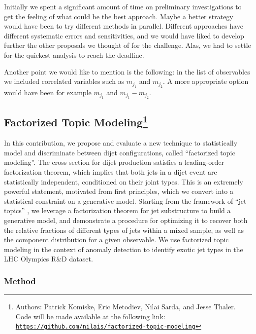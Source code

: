 \documentclass[a4paper,11pt]{article}
\begin{document}
Initially we spent a significant amount of time on preliminary investigations to get the feeling of what could be the best approach. Maybe a better strategy would have been to try different methods in parallel. Different approaches have different systematic errors and sensitivities, and we would have liked to develop further the other proposals we thought of for the challenge. Alas, we had to settle for the quickest analysis to reach the deadline.  

Another point we would like to mention is the following: in the  list of observables we included correlated variables such as  $m_{j_1}$ and $m_{j_2}$. A more appropriate option would have been for example $m_{j_1}$ and $m_{j_1}-m_{j_2}$. 

 \FloatBarrier



\subsection[Factorized Topic Modeling]{Factorized Topic Modeling\footnote{Authors: Patrick Komiske, Eric Metodiev, Nilai Sarda, and Jesse Thaler.  Code will be made available at the following link:\\ \texttt{\url{https://github.com/nilais/factorized-topic-modeling}}}}
\label{sec:factorizedtopics}

In this contribution, we propose and evaluate a new technique to statistically model and discriminate between dijet configurations, called ``factorized topic modeling''.
The cross section for dijet production satisfies a leading-order factorization theorem, which implies that both jets in a dijet event are statistically independent, conditioned on their joint types.
This is an extremely powerful statement, motivated from first principles, which we convert into a statistical constraint on a generative model.
Starting from the framework of ``jet topics'' \cite{Metodiev:2018ftz}, we leverage a factorization theorem for jet substructure to build a generative model, and demonstrate a procedure for optimizing it to recover both the relative fractions of different types of jets within a mixed sample, as well as the component distribution for a given observable. 
We use factorized topic modeling in the context of anomaly detection to identify exotic jet types in the LHC Olympics R\&D dataset.
\subsubsection{Method}
\label{sec:method}
\end{document}
